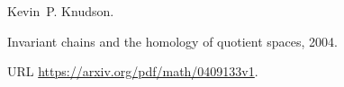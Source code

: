 Kevin~P. Knudson.

\newblock Invariant chains and the homology of quotient spaces, 2004.

\newblock URL \url{https://arxiv.org/pdf/math/0409133v1}.

